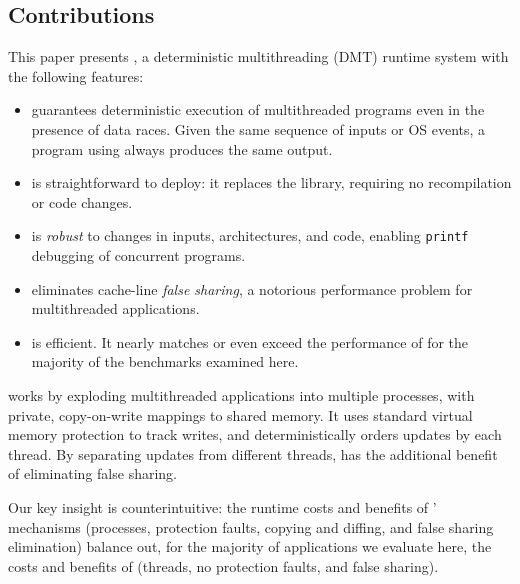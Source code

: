 
\subsection*{Contributions}

This paper presents \textbf{\dthreads{}}, a deterministic multithreading (DMT)
runtime system with the following features:

\begin{itemize}

\item \dthreads{} guarantees deterministic execution of multithreaded programs
even in the presence of data races. Given the same sequence of inputs or OS
events, a program using \dthreads{} always produces the same output.

\item \dthreads{} is straightforward to deploy: it replaces the
\pthreads{} library, requiring no recompilation or code changes.

\item \dthreads{} is \emph{robust} to changes in inputs, architectures, and
code, enabling \texttt{printf} debugging of concurrent programs.

\item \dthreads{} eliminates cache-line \emph{false sharing}, a notorious
performance problem for multithreaded applications.

\item \dthreads{} is efficient. It nearly matches or even exceed the performance
of \pthreads{} for the majority of the benchmarks examined here.

\end{itemize}

\dthreads{} works by exploding multithreaded applications into multiple
processes, with private, copy-on-write mappings to shared memory.  It uses
standard virtual memory protection to track writes, and deterministically orders
updates by each thread. By separating updates from different threads,
\dthreads{} has the additional benefit of eliminating false sharing.

Our key insight is counterintuitive: the runtime costs and benefits of
\dthreads{}' mechanisms (processes, protection faults, copying and diffing, and
false sharing elimination) balance out, for the majority of applications we
evaluate here, the costs and benefits of \pthreads{} (threads, no protection
faults, and false sharing).

